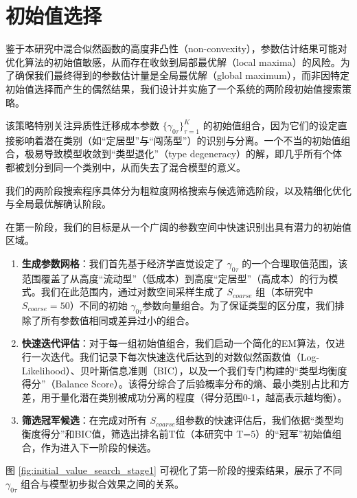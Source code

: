 \documentclass[
  a4paper,
  zihao=-4,
  fontset=mac,
  AutoFakeBold,
  AutoFakeSlant,
  oneside]{ctexbook}
\begin{document}
\section{初始值选择}

鉴于本研究中混合似然函数的高度非凸性（non-convexity），参数估计结果可能对优化算法的初始值敏感，从而存在收敛到局部最优解（local maxima）的风险。为了确保我们最终得到的参数估计量是全局最优解（global maximum），而非因特定初始值选择而产生的偶然结果，我们设计并实施了一个系统的两阶段初始值搜索策略。

该策略特别关注异质性迁移成本参数 $\{\gamma_{0\tau}\}_{\tau=1}^K$ 的初始值组合，因为它们的设定直接影响着潜在类别（如“定居型”与“闯荡型”）的识别与分离。一个不当的初始值组合，极易导致模型收敛到“类型退化”（type degeneracy）的解，即几乎所有个体都被划分到同一个类别中，从而失去了混合模型的意义。

我们的两阶段搜索程序具体分为粗粒度网格搜索与候选筛选阶段，以及精细化优化与全局最优解确认阶段。

在第一阶段，我们的目标是从一个广阔的参数空间中快速识别出具有潜力的初始值区域。
\begin{enumerate}
\item \textbf{生成参数网格}：我们首先基于经济学直觉设定了 $\gamma_{0\tau}$ 的一个合理取值范围，该范围覆盖了从高度“流动型”（低成本）到高度“定居型”（高成本）的行为模式。我们在此范围内，通过对数空间采样生成了 $S_{coarse}$ 组（本研究中 $S_{coarse}=50$）不同的初始 $\gamma_{0\tau} $参数向量组合。为了保证类型的区分度，我们排除了所有参数值相同或差异过小的组合。

\item \textbf{快速迭代评估}：对于每一组初始值组合，我们启动一个简化的EM算法，仅进行一次迭代。我们记录下每次快速迭代后达到的对数似然函数值（Log-Likelihood）、贝叶斯信息准则（BIC），以及一个我们专门构建的“类型均衡度得分”（Balance Score）。该得分综合了后验概率分布的熵、最小类别占比和方差，用于量化潜在类别被成功分离的程度（得分范围0-1，越高表示越均衡）。

\item \textbf{筛选冠军候选}：在完成对所有 $S_{coarse}$组参数的快速评估后，我们依据“类型均衡度得分”和BIC值，筛选出排名前T位（本研究中 T=5）的“冠军”初始值组合，作为进入下一阶段的候选。

\end{enumerate}
图 \ref{fig:initial_value_search_stage1} 可视化了第一阶段的搜索结果，展示了不同 $\gamma_{0\tau}$ 组合与模型初步拟合效果之间的关系。
\end{document}
